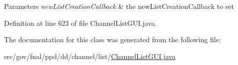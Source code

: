 \begin{DoxyParams}{Parameters}
{\em new\-List\-Creation\-Callback} & the new\-List\-Creation\-Callback to set \\
\hline
\end{DoxyParams}


Definition at line 623 of file Channel\-List\-G\-U\-I.\-java.



The documentation for this class was generated from the following file\-:\begin{DoxyCompactItemize}
\item 
src/gov/fnal/ppd/dd/channel/list/\hyperlink{ChannelListGUI_8java}{Channel\-List\-G\-U\-I.\-java}\end{DoxyCompactItemize}
